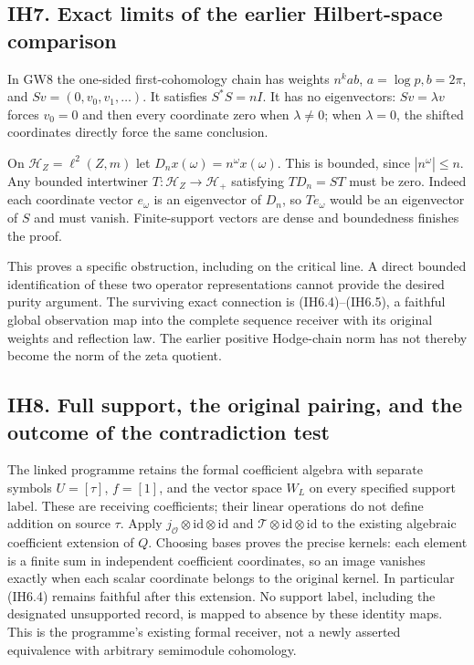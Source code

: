 \subsection{IH7. Exact limits of the earlier Hilbert-space
comparison}\label{ih7.-exact-limits-of-the-earlier-hilbert-space-comparison}

In GW8 the one-sided first-cohomology chain has weights \(n^kab\),
\(a=\log p,b=2\pi\), and \(Sv=(0,v_0,v_1,\ldots)\). It satisfies
\(S^*S=nI\). It has no eigenvectors: \(Sv=\lambda v\) forces \(v_0=0\)
and then every coordinate zero when \(\lambda\ne0\); when \(\lambda=0\),
the shifted coordinates directly force the same conclusion.

On \(\mathcal H_Z=\ell^2(Z,m)\) let \(D_nx(\omega)=n^\omega x(\omega)\).
This is bounded, since \(|n^\omega|\le n\). Any bounded intertwiner
\(T:\mathcal H_Z\to\mathcal H_+\) satisfying \(TD_n=ST\) must be zero.
Indeed each coordinate vector \(e_\omega\) is an eigenvector of \(D_n\),
so \(Te_\omega\) would be an eigenvector of \(S\) and must vanish.
Finite-support vectors are dense and boundedness finishes the proof.

This proves a specific obstruction, including on the critical line. A
direct bounded identification of these two operator representations
cannot provide the desired purity argument. The surviving exact
connection is (IH6.4)--(IH6.5), a faithful global observation map into
the complete sequence receiver with its original weights and reflection
law. The earlier positive Hodge-chain norm has not thereby become the
norm of the zeta quotient.

\subsection{IH8. Full support, the original pairing, and the outcome of
the contradiction
test}\label{ih8.-full-support-the-original-pairing-and-the-outcome-of-the-contradiction-test}

The linked programme retains the formal coefficient algebra with
separate symbols \(U=[\tau]\), \(f=[1]\), and the vector space \(W_L\)
on every specified support label. These are receiving coefficients;
their linear operations do not define addition on source \(\tau\). Apply
\(j_{\mathcal O}\otimes\mathrm{id}\otimes\mathrm{id}\) and
\(\mathcal T\otimes\mathrm{id}\otimes\mathrm{id}\) to the existing
algebraic coefficient extension of \(Q\). Choosing bases proves the
precise kernels: each element is a finite sum in independent coefficient
coordinates, so an image vanishes exactly when each scalar coordinate
belongs to the original kernel. In particular (IH6.4) remains faithful
after this extension. No support label, including the designated
unsupported record, is mapped to absence by these identity maps. This is
the programme's existing formal receiver, not a newly asserted
equivalence with arbitrary semimodule cohomology.

